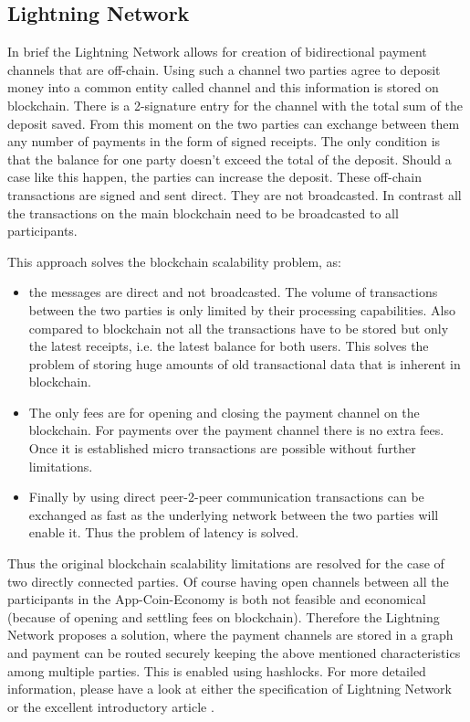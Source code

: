 \subsection{Lightning Network}
In brief the Lightning Network allows for creation of bidirectional payment channels that are off-chain. Using such a channel two parties agree to deposit money into a common entity called channel and this information is stored on blockchain. There is a 2-signature entry for the channel with the total sum of the deposit saved. From this moment on the two parties can exchange between them any number of payments in the form of signed receipts. The only condition is that the balance for one party doesn't exceed the total of the deposit. Should a case like this happen, the parties can increase the deposit. These off-chain transactions are signed and sent direct. They are not broadcasted. In contrast all the transactions on the main blockchain need to be broadcasted to all participants. 

This approach solves the blockchain scalability problem, as:

\begin{itemize}
    \item the messages are direct and not broadcasted. The volume of transactions between the two parties is only limited by their processing capabilities. Also compared to blockchain not all the transactions have to be stored but only the latest receipts, i.e. the latest balance for both users. This solves the problem of storing huge amounts of old transactional data that is inherent in blockchain.
    \item The only fees are for opening and closing the payment channel on the blockchain. For payments over the payment channel there is no extra fees. Once it is established micro transactions are possible without further limitations.
    \item Finally by using direct peer-2-peer communication transactions can be exchanged as fast as the underlying network between the two parties will enable it. Thus the problem of latency is solved.
\end{itemize}

Thus the original blockchain scalability limitations are resolved for the case of two directly connected parties. Of course having open channels between all the participants in the App-Coin-Economy is both not feasible and economical (because of opening and settling fees on blockchain). Therefore the Lightning Network proposes a solution, where the payment channels are stored in a graph and payment can be routed securely keeping the above mentioned characteristics among multiple parties. This is enabled using hashlocks. For more detailed information, please have a look at either the specification of Lightning Network or the excellent introductory article \cite{starkness}.



